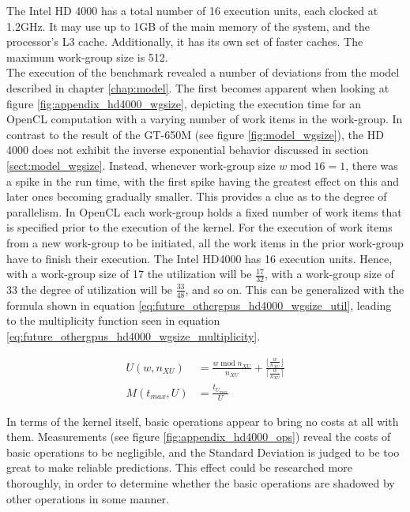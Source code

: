 The Intel HD 4000 has a total number of 16 execution units, each clocked at 1.2GHz. It may use up to 1GB of the main memory of the system, and the processor's L3 cache. Additionally, it has its own set of faster caches. The maximum work-group size is 512. \cite{check2012hd4000}\\

The execution of the benchmark revealed a number of deviations from the model described in chapter \ref{chap:model}. The first becomes apparent when looking at figure \ref{fig:appendix_hd4000_wgsize}, depicting the execution time for an OpenCL computation with a varying number of work items in the work-group. In contrast to the result of the GT-650M (see figure \ref{fig:model_wgsize}), the HD 4000 does not exhibit the inverse exponential behavior discussed in section \ref{sect:model_wgsize}. Instead, whenever work-group size $w \operatorname{mod} 16 = 1$, there was a spike in the run time, with the first spike having the greatest effect on this and later ones becoming gradually smaller. This provides a clue as to the degree of parallelism. In OpenCL each work-group holds a fixed number of work items that is specified prior to the execution of the kernel. For the execution of work items from a new work-group to be initiated, all the work items in the prior work-group have to finish their execution. The Intel HD4000 has 16 execution units. Hence, with a work-group size of 17 the utilization will be $\frac{17}{32}$, with a work-group size of 33 the degree of utilization will be $\frac{33}{48}$, and so on. This can be generalized with the formula shown in equation \ref{eq:future_othergpus_hd4000_wgsize_util}, leading to the multiplicity function seen in equation \ref{eq:future_othergpus_hd4000_wgsize_multiplicity}.

\begin{align}
	\label{eq:future_othergpus_hd4000_wgsize_util} U(w, n_{XU}) &= \frac{w \operatorname{mod} n_{XU}}{n_{XU}} + \frac{\lfloor \frac{w}{n_{XU}}\rfloor}{\lceil \frac{w}{n_{XU}}\rceil} \\
	\label{eq:future_othergpus_hd4000_wgsize_multiplicity} M(t_{max}, U) &= \frac{t_{U_{max}}}{U}
\end{align}

In terms of the kernel itself, basic operations appear to bring no costs at all with them. Measurements (see figure \ref{fig:appendix_hd4000_ops}) reveal the costs of basic operations to be negligible, and the Standard Deviation is judged to be too great to make reliable predictions. This effect could be researched more thoroughly, in order to determine whether the basic operations are shadowed by other operations in some manner. \\

